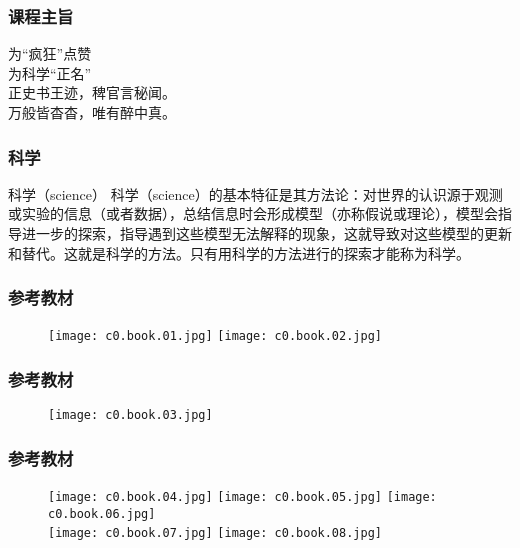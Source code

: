 \begin{frame}[fragile]
  \frametitle{课程主旨}
  \begin{center}
  {\Huge 为“疯狂”点赞\\
    \vspace{0.5cm}
    为科学“正名”}\\
  \vspace{1cm}
  {\Large 正史书王迹，稗官言秘闻。\\
    \vspace{0.2cm}
    万般皆杳杳，唯有醉中真。}
\end{center}
\end{frame}

\begin{frame}
  \frametitle{科学}
  \begin{block}{科学（science）}
科学（science）的基本特征是其方法论：对世界的认识源于观测或实验的信息（或者数据），总结信息时会形成模型（亦称假说或理论），模型会指导进一步的探索，指导遇到这些模型无法解释的现象，这就导致对这些模型的更新和替代。这就是科学的方法。只有用科学的方法进行的探索才能称为科学。
  \end{block}
\end{frame}

\begin{frame}
  \frametitle{参考教材}
  \begin{figure}
    \centering
    \texttt{[image: c0.book.01.jpg]}
    \qquad
    \texttt{[image: c0.book.02.jpg]}
  \end{figure}
\end{frame}

\begin{frame}
  \frametitle{参考教材}
  \begin{figure}
    \centering
    \texttt{[image: c0.book.03.jpg]}
  \end{figure}
\end{frame}

\begin{frame}
  \frametitle{参考教材}
  \begin{figure}
    \centering
    \texttt{[image: c0.book.04.jpg]}\quad
    \texttt{[image: c0.book.05.jpg]}\quad
    \texttt{[image: c0.book.06.jpg]}\\
    \texttt{[image: c0.book.07.jpg]}\hspace{1cm}
    \texttt{[image: c0.book.08.jpg]}
  \end{figure}
\end{frame}


